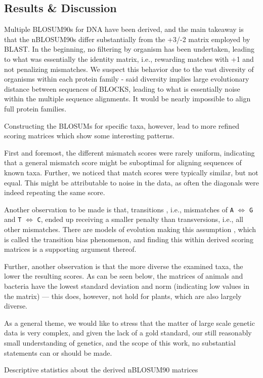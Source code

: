 \documentclass{article}
\begin{document}
\subsection*{Results \& Discussion}	
	Multiple BLOSUM90s for DNA have been derived, and the main takeaway is that the nBLOSUM90s differ substantially from the +3/-2 matrix employed by BLAST. 	
	In the beginning, no filtering by organism has been undertaken, leading 
	to what was essentially the identity matrix, i.e., rewarding matches
	with +1 and not penalizing mismatches. We suspect this behavior due to
	the vast diversity of organisms within each protein family - said
	diversity implies large evolutionary distance between sequences of
	BLOCKS, leading to what is essentially noise within the multiple
	sequence alignments. It would be nearly impossible to align full
	protein families.
	
	Constructing the BLOSUMs for specific taxa, however, lead to
	more refined scoring matrices which show some interesting patterns.

	First and foremost, the different mismatch scores were rarely uniform, indicating that a general mismatch score might be suboptimal for aligning sequences of known taxa. 	Further, we noticed that match scores were typically similar, but not
	equal. This might be attributable to noise in the data, as
	often the diagonals were indeed repeating the same score. 

	Another observation to be made is that, transitions
	, i.e., mismatches of \texttt{A} $\iff$ \texttt{G} and \texttt{T}
	$\iff$ \texttt{C}, ended up receiving a smaller penalty than
	transversions, i.e., all other mismatches. There are models of
	evolution making this assumption \cite{kimuraEstimationEvolutionaryDistances1981}, which is called
	the transition bias phenomenon, and
	finding this within derived scoring matrices is a supporting argument thereof.

	Further, another observation is that the more diverse the examined taxa,
	the lower the resulting scores. As can be seen below,
	the matrices of animals and bacteria have the lowest standard deviation and norm (indicating low values in the matrix) --- this does, however, not hold for plants, which are also largely diverse. 
	
As a general theme, we would like to stress that the matter of large scale genetic data is very complex, and given the lack of a gold standard, our still reasonably small understanding of genetics, and the scope of this work, no substantial statements can or should be made.
	\begin{table}[h] \label{desctable}
		
		\caption{Descriptive statistics about the derived nBLOSUM90 matrices}
	\end{table}
\end{document}
